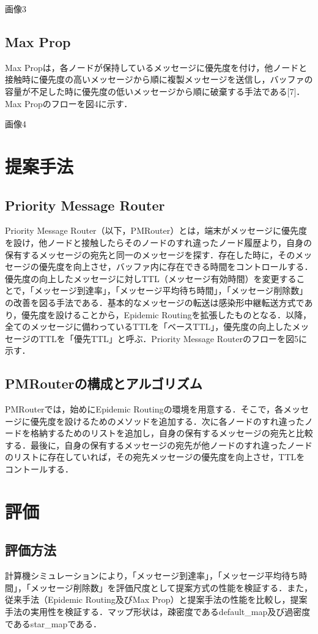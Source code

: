 \documentclass[11pt]{icsthesis}
\begin{document}
画像3

\section{Max Prop}
Max Propは，各ノードが保持しているメッセージに優先度を付け，他ノードと接触時に優先度の高いメッセージから順に複製メッセージを送信し，バッファの容量が不足した時に優先度の低いメッセージから順に破棄する手法である[7]．Max Propのフローを図4に示す．

画像4

\chapter{提案手法}
\section{Priority Message Router}
Priority Message Router（以下，PMRouter）とは，端末がメッセージに優先度を設け，他ノードと接触したらそのノードのすれ違ったノード履歴より，自身の保有するメッセージの宛先と同一のメッセージを探す．存在した時に，そのメッセージの優先度を向上させ，バッファ内に存在できる時間をコントロールする．優先度の向上したメッセージに対しTTL（メッセージ有効時間）を変更することで，「メッセージ到達率」，「メッセージ平均待ち時間」，「メッセージ削除数」の改善を図る手法である．基本的なメッセージの転送は感染形中継転送方式であり，優先度を設けることから，Epidemic Routingを拡張したものとなる．以降，全てのメッセージに備わっているTTLを「ベースTTL」，優先度の向上したメッセージのTTLを「優先TTL」と呼ぶ．Priority Message Routerのフローを図5に示す．

\section{PMRouterの構成とアルゴリズム}
PMRouterでは，始めにEpidemic Routingの環境を用意する．そこで，各メッセージに優先度を設けるためのメソッドを追加する．次に各ノードのすれ違ったノードを格納するためのリストを追加し，自身の保有するメッセージの宛先と比較する．最後に，自身の保有するメッセージの宛先が他ノードのすれ違ったノードのリストに存在していれば，その宛先メッセージの優先度を向上させ，TTLをコントールする．

\chapter{評価}
\section{評価方法}
計算機シミュレーションにより，「メッセージ到達率」，「メッセージ平均待ち時間」，「メッセージ削除数」を評価尺度として提案方式の性能を検証する．また，従来手法（Epidemic Routing及びMax Prop）と提案手法の性能を比較し，提案手法の実用性を検証する．マップ形状は，疎密度であるdefault\_map及び過密度であるstar\_mapである．
\end{document}
